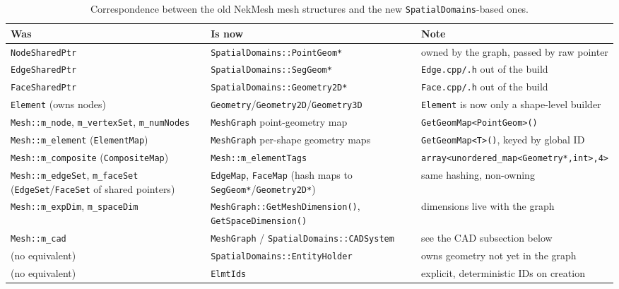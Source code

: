 \begin{table}[h!]
  \centering
  \begin{tabular}{p{}p{}p{}}
    \hline
    \textbf{Was} & \textbf{Is now} & \textbf{Note}\\
    \hline
    \texttt{NodeSharedPtr} &
    \texttt{SpatialDomains::PointGeom*} &
    owned by the graph, passed by raw pointer\\
    \texttt{EdgeSharedPtr} &
    \texttt{SpatialDomains::SegGeom*} &
    \texttt{Edge.cpp/.h} out of the build\\
    \texttt{FaceSharedPtr} &
    \texttt{SpatialDomains::Geometry2D*} &
    \texttt{Face.cpp/.h} out of the build\\
    \texttt{Element} (owns nodes) &
    \texttt{Geometry}/\texttt{Geometry2D}/\texttt{Geometry3D} &
    \texttt{Element} is now only a shape-level builder\\
    \texttt{Mesh::m\_node}, \texttt{m\_vertexSet}, \texttt{m\_numNodes} &
    \texttt{MeshGraph} point-geometry map &
    \texttt{GetGeomMap<PointGeom>()}\\
    \texttt{Mesh::m\_element} (\texttt{ElementMap}) &
    \texttt{MeshGraph} per-shape geometry maps &
    \texttt{GetGeomMap<T>()}, keyed by global ID\\
    \texttt{Mesh::m\_composite} (\texttt{CompositeMap}) &
    \texttt{Mesh::m\_elementTags} &
    \texttt{array<unordered\_map<Geometry*,int>,4>}\\
    \texttt{Mesh::m\_edgeSet}, \texttt{m\_faceSet}
    (\texttt{EdgeSet}/\texttt{FaceSet} of shared pointers) &
    \texttt{EdgeMap}, \texttt{FaceMap}
    (hash maps to \texttt{SegGeom*}/\texttt{Geometry2D*}) &
    same hashing, non-owning\\
    \texttt{Mesh::m\_expDim}, \texttt{m\_spaceDim} &
    \texttt{MeshGraph::GetMeshDimension()},
    \texttt{GetSpaceDimension()} &
    dimensions live with the graph\\
    \texttt{Mesh::m\_cad} &
    \texttt{MeshGraph} / \texttt{SpatialDomains::CADSystem} &
    see the CAD subsection below\\
    (no equivalent) &
    \texttt{SpatialDomains::EntityHolder} &
    owns geometry not yet in the graph\\
    (no equivalent) &
    \texttt{ElmtIds} &
    explicit, deterministic IDs on creation\\
    \hline
  \end{tabular}
  \caption{Correspondence between the old NekMesh mesh structures and
    the new \texttt{SpatialDomains}-based ones.}
  \label{tab:ds_mapping}
\end{table}

